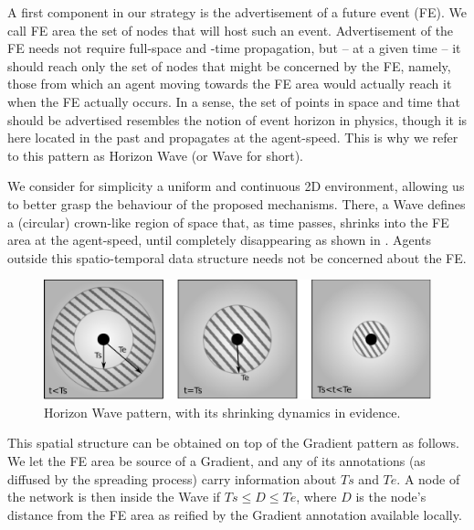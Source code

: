 \documentclass[12pt,a4paper,twoside,openright]{book}
\begin{document}
A first component in our strategy is the advertisement of a future event (FE). We call FE area the set of nodes that will host such an event.
%
Advertisement of the FE needs not require full-space and -time propagation, but -- at a given time -- it should reach only the set of nodes that might be concerned by the FE, namely, those from which an agent moving towards the FE area would actually reach it when the FE actually occurs.
%
In a sense, the set of points in space and time that should be advertised resembles the notion of event horizon in physics, though it is here located in the past and propagates at the agent-speed.
%
This is why we refer to this pattern as Horizon Wave (or Wave for short).

We consider for simplicity a uniform and continuous 2D environment, allowing us to better grasp the behaviour of the proposed mechanisms.
%
There, a Wave defines a (circular) crown-like region of space that, as time passes, shrinks into the FE area at the agent-speed, until completely disappearing as shown in .
%
Agents outside this spatio-temporal data structure needs not be concerned about the FE.

\begin{figure}
	\begin{center}
		\includegraphics[width=\textwidth]{img/wave}
\end{center}
\caption[Horizon Wave pattern]{Horizon Wave pattern, with its shrinking dynamics in evidence.}
\label{fig:wave} 
\end{figure}

This spatial structure can be obtained on top of the Gradient pattern as follows.
%
We let the FE area be source of a Gradient, and any of its annotations (as diffused by the spreading process) carry information about $Ts$ and $Te$.
%
A node of the network is then inside the Wave if $Ts\leq D \leq Te$, where $D$ is the node's distance from the FE area as reified by the Gradient annotation available locally.
\end{document}
